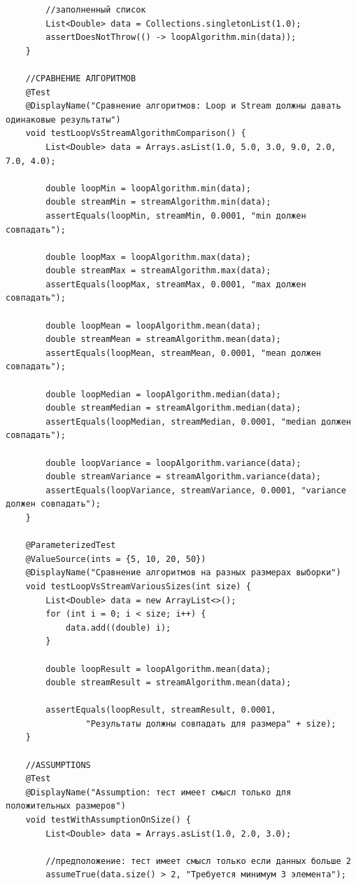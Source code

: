\begin{verbatim}
        //заполненный список
        List<Double> data = Collections.singletonList(1.0);
        assertDoesNotThrow(() -> loopAlgorithm.min(data));
    }

    //СРАВНЕНИЕ АЛГОРИТМОВ
    @Test
    @DisplayName("Сравнение алгоритмов: Loop и Stream должны давать одинаковые результаты")
    void testLoopVsStreamAlgorithmComparison() {
        List<Double> data = Arrays.asList(1.0, 5.0, 3.0, 9.0, 2.0, 7.0, 4.0);

        double loopMin = loopAlgorithm.min(data);
        double streamMin = streamAlgorithm.min(data);
        assertEquals(loopMin, streamMin, 0.0001, "min должен совпадать");

        double loopMax = loopAlgorithm.max(data);
        double streamMax = streamAlgorithm.max(data);
        assertEquals(loopMax, streamMax, 0.0001, "max должен совпадать");

        double loopMean = loopAlgorithm.mean(data);
        double streamMean = streamAlgorithm.mean(data);
        assertEquals(loopMean, streamMean, 0.0001, "mean должен совпадать");

        double loopMedian = loopAlgorithm.median(data);
        double streamMedian = streamAlgorithm.median(data);
        assertEquals(loopMedian, streamMedian, 0.0001, "median должен совпадать");

        double loopVariance = loopAlgorithm.variance(data);
        double streamVariance = streamAlgorithm.variance(data);
        assertEquals(loopVariance, streamVariance, 0.0001, "variance должен совпадать");
    }

    @ParameterizedTest
    @ValueSource(ints = {5, 10, 20, 50})
    @DisplayName("Сравнение алгоритмов на разных размерах выборки")
    void testLoopVsStreamVariousSizes(int size) {
        List<Double> data = new ArrayList<>();
        for (int i = 0; i < size; i++) {
            data.add((double) i);
        }

        double loopResult = loopAlgorithm.mean(data);
        double streamResult = streamAlgorithm.mean(data);

        assertEquals(loopResult, streamResult, 0.0001,
                "Результаты должны совпадать для размера" + size);
    }

    //ASSUMPTIONS
    @Test
    @DisplayName("Assumption: тест имеет смысл только для положительных размеров")
    void testWithAssumptionOnSize() {
        List<Double> data = Arrays.asList(1.0, 2.0, 3.0);

        //предположение: тест имеет смысл только если данных больше 2
        assumeTrue(data.size() > 2, "Требуется минимум 3 элемента");


\end{verbatim}
